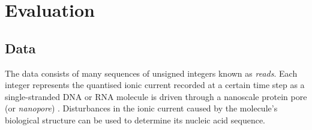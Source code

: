 \chapter{Evaluation} \label{chap:evaluation}

\section{Data} \label{sec:data}

The data consists of many sequences of unsigned integers known as \textit{reads}. Each integer represents the quantised ionic current recorded at a certain time step as a single-stranded DNA or RNA molecule is driven through a nanoscale protein pore (or \textit{nanopore}) \cite{Wang2021}. Disturbances in the ionic current caused by the molecule's biological structure can be used to determine its nucleic acid sequence.
